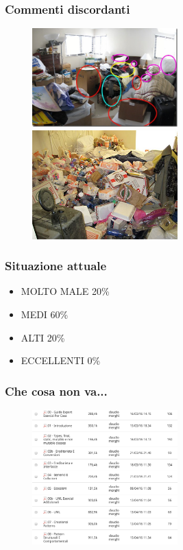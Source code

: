 \documentclass{beamer}
\begin{document}
\begin{frame}
\frametitle{Commenti discordanti}
\begin{figure}
\centering
\includegraphics[width=0.5\textwidth]{Img/commenti1.jpg}
\includegraphics[width=0.5\textwidth]{Img/commenti2.jpg}
\end{figure}
\end{frame}


\begin{frame}
\frametitle{Situazione attuale}
\begin{itemize}
\item MOLTO MALE 20\% 
\item MEDI 60\% 
\item ALTI 20\% 
\item ECCELLENTI 0\% 
\end{itemize}
\end{frame}


\begin{frame}
\frametitle{Che cosa non va...}
\begin{figure}
\centering
\includegraphics[width=0.5\textwidth]{Img/download.png}
\end{figure}
\end{frame}
\end{document}
